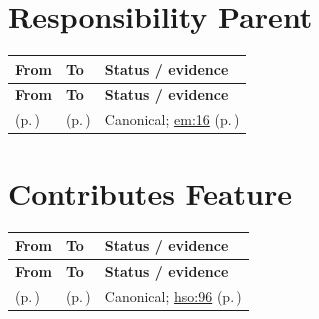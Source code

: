 \section{Responsibility Parent}
\begingroup\small\setlength{\TableWidth}{\dimexpr\linewidth-6\tabcolsep-4\arrayrulewidth\relax}
\begin{longtable}{|>{\raggedright\arraybackslash}p{0.32\TableWidth}|>{\raggedright\arraybackslash}p{0.32\TableWidth}|>{\raggedright\arraybackslash}p{0.36\TableWidth}|}
\hline\rowcolor{TableHead}\textbf{From} & \textbf{To} & \textbf{Status / evidence}\\\hline\endfirsthead
\hline\rowcolor{TableHead}\textbf{From} & \textbf{To} & \textbf{Status / evidence}\\\hline\endhead
\hline\endfoot
\nameref{cap:bec-client-administration} (p.\,\pageref{cap:bec-client-administration}) & \nameref{cap:bec-person-identity} (p.\,\pageref{cap:bec-person-identity}) & Canonical; \hyperref[rad:em:16]{em:16} (p.\,\pageref{rad:em:16})\\\hline
\end{longtable}\endgroup
\section{Contributes Feature}
\begingroup\small\setlength{\TableWidth}{\dimexpr\linewidth-6\tabcolsep-4\arrayrulewidth\relax}
\begin{longtable}{|>{\raggedright\arraybackslash}p{0.32\TableWidth}|>{\raggedright\arraybackslash}p{0.32\TableWidth}|>{\raggedright\arraybackslash}p{0.36\TableWidth}|}
\hline\rowcolor{TableHead}\textbf{From} & \textbf{To} & \textbf{Status / evidence}\\\hline\endfirsthead
\hline\rowcolor{TableHead}\textbf{From} & \textbf{To} & \textbf{Status / evidence}\\\hline\endhead
\hline\endfoot
\nameref{function:manage-ward-capacity} (p.\,\pageref{function:manage-ward-capacity}) & \nameref{feature:feat-hso-03} (p.\,\pageref{feature:feat-hso-03}) & Canonical; \hyperref[rad:hso:90]{hso:96} (p.\,\pageref{rad:hso:90})\\\hline
\end{longtable}\endgroup
